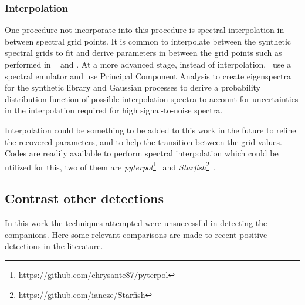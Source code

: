 \subsubsection{Interpolation}
\label{subsubsec:interpolation}
One procedure not incorporate into this \textchisquared{} procedure is spectral interpolation in between spectral grid points.
It is common to interpolate between the synthetic spectral grids to fit and derive parameters in between the grid points such as performed in ~\citet{nemravova_xtauri_2016} and \citet{passegger_fundamental_2016}.
At a more advanced stage, instead of interpolation,~\cite{czekala_constructing_2015} use a spectral emulator and use Principal Component Analysis to create eigenspectra for the synthetic library and Gaussian processes to derive a probability distribution function of possible interpolation spectra to account for uncertainties in the interpolation required for high signal-to-noise spectra.

Interpolation could be something to be added to this work in the future to refine the recovered parameters, and to help the transition between the grid \logg{} values.
Codes are readily available to perform spectral interpolation which could be utilized for this, two of them are \emph{pyterpol}\footnote{https://github.com/chrysante87/pyterpol}~\citet{nemravova_xtauri_2016} and \emph{Starfish}\footnote{https://github.com/iancze/Starfish}~\cite{czekala_constructing_2015}.


\subsection{Contrast other detections}

In this work the techniques attempted were unsuccessful in detecting the companions. Here some relevant comparisons are made to recent positive detections in the literature.

